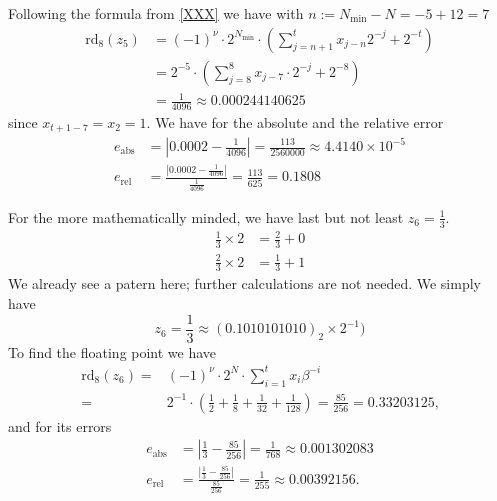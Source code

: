 \begin{exmp}
\begin{equation*}
    \end{equation*}
    Following the formula from \ref{XXX} we have with \(n := N_{\text{min}} - N = -5 + 12 = 7\)
    \begin{align*}
        \text{rd}_8(z_5) &= (-1)^{\nu} \cdot 2^{N_\text{min}} \cdot \left( \sum_{j = n + 1}^{t} x_{j-n}2^{-j} + 2^{-t} \right) \\
        &= 2^{-5} \cdot \left(\sum_{j = 8}^8 x_{j-7} \cdot 2^{-j} + 2^{-8} \right) \\
        &= \frac{1}{4096} \approx 0.000244140625
    \end{align*}
    since \(x_{t + 1 - 7} = x_2 = 1\).
    We have for the absolute and the relative error
    \begin{align*}
        e_{\text{abs}} &= \left| 0.0002 - \frac{1}{4096} \right| = \frac{113}{2560000} \approx 4.4140 \times 10^{-5} \\
        e_{\text{rel}} &= \frac{\left| 0.0002 - \frac{1}{4096} \right|}{\frac{1}{4096}} = \frac{113}{625} = 0.1808
    \end{align*}
\end{exmp}
\begin{exmp}
    For the more mathematically minded, we have last but not least \(z_6 = \frac{1}{3}\).
    \begin{align*}
        \frac{1}{3} \times 2 &= \frac{2}{3} + 0 \\
        \frac{2}{3} \times 2 &= \frac{1}{3} + 1
    \end{align*}
    We already see a patern here; further calculations are not needed. We simply have
    \begin{equation*}
        z_6 = \frac{1}{3} \approx (0.1010101010)_2 \times 2^{-1})
    \end{equation*}
    To find the floating point we have
    \begin{align*}
        \text{rd}_8(z_6) =& (-1)^{\nu} \cdot 2^N \cdot \sum_{i=1}^{t}x_i \beta^{-i} \\
        =& 2^{-1} \cdot \left(\frac{1}{2} + \frac{1}{8} + \frac{1}{32} + \frac{1}{128} \right) = \frac{85}{256} = 0.33203125 \text{,}
    \end{align*}
    and for its errors
    \begin{align*}
        e_{\text{abs}} &= \left| \frac{1}{3} - \frac{85}{256} \right| = \frac{1}{768} \approx 0.001302083 \\
        e_{\text{rel}} &= \frac{\left| \frac{1}{3} - \frac{85}{256} \right|}{\frac{85}{256}} = \frac{1}{255} \approx 0.00392156 \text{.}
    \end{align*}
\end{exmp}
